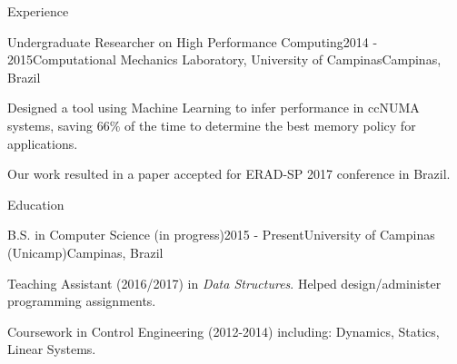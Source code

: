 \documentclass[8pt]{resume}
\newcommand{\tit}[1]{\textit{#1}}
\begin{document}
\begin{rSection}{Experience}
\begin{rSubsection}{Undergraduate Researcher on High Performance Computing}{2014 - 2015}{Computational Mechanics Laboratory, University of Campinas}{Campinas, Brazil}
    \item Designed a tool using Machine Learning to infer performance
        in ccNUMA systems, saving $66\%$ of the time to
        determine the best memory policy for applications.
    \item Our work resulted in a paper accepted for ERAD-SP 2017 conference in Brazil.
\end{rSubsection}


\end{rSection}

\begin{rSection}{Education}

    \begin{rSubsection}{B.S. in Computer Science (in progress)}{2015 - Present}{University of Campinas (Unicamp)}{Campinas, Brazil}
    \item Teaching Assistant (2016/2017) in \tit{Data Structures}. Helped
        design/administer programming assignments.
    \item Coursework in Control Engineering (2012-2014) including:
        Dynamics, Statics, Linear Systems.
\end{rSubsection}

\end{rSection}
\end{document}
